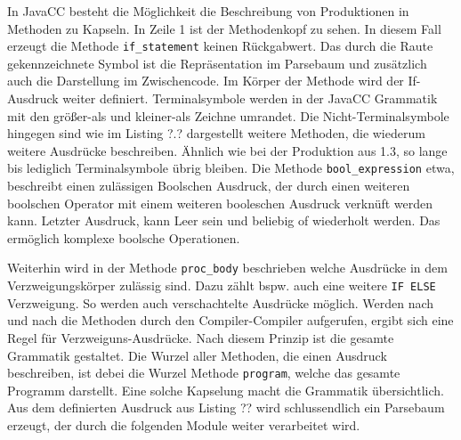 In JavaCC besteht die Möglichkeit die Beschreibung von Produktionen in Methoden zu Kapseln.
In Zeile 1 ist der Methodenkopf zu sehen. In diesem Fall erzeugt die Methode \verb+if_statement+ keinen Rückgabwert.
Das durch die Raute gekennzeichnete Symbol ist die Repräsentation im Parsebaum und zusätzlich auch die Darstellung im Zwischencode.
Im Körper der Methode wird der If-Ausdruck weiter definiert. Terminalsymbole werden in der JavaCC Grammatik mit den größer-als und kleiner-als Zeichne umrandet. Die Nicht-Terminalsymbole hingegen sind wie im Listing ?.? dargestellt weitere Methoden, die wiederum weitere Ausdrücke beschreiben.
Ähnlich wie bei der Produktion aus 1.3, so lange bis lediglich Terminalsymbole übrig bleiben.
Die Methode \verb+bool_expression+ etwa, beschreibt einen zulässigen Boolschen Ausdruck, der durch einen weiteren boolschen Operator mit einem weiteren booleschen Ausdruck verknüft werden kann.
Letzter Ausdruck, kann Leer sein und beliebig of wiederholt werden. Das ermöglich komplexe boolsche Operationen.

Weiterhin wird in der Methode \verb+proc_body+ beschrieben welche Ausdrücke in dem Verzweigungskörper zulässig sind. Dazu zählt bspw. auch eine weitere \verb+IF ELSE+ Verzweigung. So werden auch verschachtelte Ausdrücke möglich.
Werden nach und nach die Methoden durch den Compiler-Compiler aufgerufen, ergibt sich eine Regel für Verzweiguns-Ausdrücke. Nach diesem Prinzip ist die gesamte Grammatik gestaltet. 
Die Wurzel aller Methoden, die einen Ausdruck beschreiben, ist debei die Wurzel Methode \verb+program+, welche das gesamte Programm darstellt. Eine solche Kapselung macht die Grammatik übersichtlich.
Aus dem definierten Ausdruck aus Listing ?? wird schlussendlich ein Parsebaum erzeugt, der durch die folgenden Module weiter verarbeitet wird.


